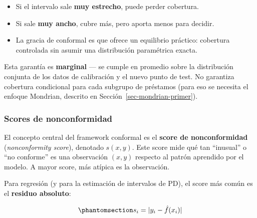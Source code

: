 \documentclass[
  spanish,
  11pt,
  letterpaper,
]{scrbook}
\providecommand{\tightlist}{%
  \setlength{\itemsep}{0pt}\setlength{\parskip}{0pt}}
\theoremstyle{plain}
\theoremstyle{remark}
\begin{document}
\begin{tcolorbox}[enhanced jigsaw, arc=.35mm, bottomrule=.15mm, bottomtitle=1mm, breakable, colback=white, colbacktitle=quarto-callout-note-color!10!white, colframe=quarto-callout-note-color-frame, coltitle=black, left=2mm, leftrule=.75mm, opacityback=0, opacitybacktitle=0.6, rightrule=.15mm, title=\textcolor{quarto-callout-note-color}{\faInfo}\hspace{0.5em}{¿Qué significa esa garantía en este libro?}, titlerule=0mm, toprule=.15mm, toptitle=1mm]

\begin{itemize}
\tightlist
\item
  Si el intervalo sale \textbf{muy estrecho}, puede perder cobertura.
\item
  Si sale \textbf{muy ancho}, cubre más, pero aporta menos para decidir.
\item
  La gracia de conformal es que ofrece un equilibrio práctico: cobertura
  controlada sin asumir una distribución paramétrica exacta.
\end{itemize}

\end{tcolorbox}

Esta garantía es \textbf{marginal} --- se cumple en promedio sobre la
distribución conjunta de los datos de calibración y el nuevo punto de
test. No garantiza cobertura condicional para cada subgrupo de préstamos
(para eso se necesita el enfoque Mondrian, descrito en
Sección~\ref{sec-mondrian-primer}).

\subsubsection{Scores de
nonconformidad}\label{sec-nonconformity-scores-primer}

El concepto central del framework conformal es el \textbf{score de
nonconformidad} (\emph{nonconformity score}), denotado \(s(x, y)\). Este
score mide qué tan ``inusual'' o ``no conforme'' es una observación
\((x, y)\) respecto al patrón aprendido por el modelo. A mayor score,
más atípica es la observación.

Para regresión (y para la estimación de intervalos de PD), el score más
común es el \textbf{residuo absoluto}:

\begin{equation}\protect\phantomsection\label{eq-residual-score}{
s_i = |y_i - \hat{f}(x_i)|
}\end{equation}
\end{document}
